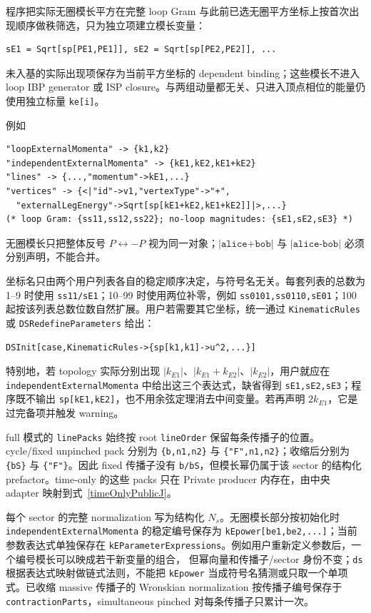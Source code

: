 ﻿\documentclass[a4paper,11pt]{article}
\begin{document}
程序把实际无圈模长平方在完整 loop Gram 与此前已选无圈平方坐标上按首次出现顺序做秩筛选，只为独立项建立模长变量：
\begin{verbatim}
sE1 = Sqrt[sp[PE1,PE1]], sE2 = Sqrt[sp[PE2,PE2]], ...
\end{verbatim}
未入基的实际出现项保存为当前平方坐标的 dependent binding；这些模长不进入 loop IBP generator 或 ISP closure。与两组动量都无关、只进入顶点相位的能量仍使用独立标量 \texttt{ke[i]}。

例如
\begin{verbatim}
"loopExternalMomenta" -> {k1,k2}
"independentExternalMomenta" -> {kE1,kE2,kE1+kE2}
"lines" -> {...,"momentum"->kE1,...}
"vertices" -> {<|"id"->v1,"vertexType"->"+",
  "externalLegEnergy"->Sqrt[sp[kE1+kE2,kE1+kE2]]|>,...}
(* loop Gram: {ss11,ss12,ss22}; no-loop magnitudes: {sE1,sE2,sE3} *)
\end{verbatim}
无圈模长只把整体反号 $P\leftrightarrow-P$ 视为同一对象；$|\texttt{alice+bob}|$ 与 $|\texttt{alice-bob}|$ 必须分别声明，不能合并。

坐标名只由两个用户列表各自的稳定顺序决定，与符号名无关。每套列表的总数为 1--9 时使用 \texttt{ss11/sE1}；10--99 时使用两位补零，例如 \texttt{ss0101,ss0110,sE01}；100 起按该列表总数位数自然扩展。用户若需要其它坐标，统一通过 \texttt{KinematicRules} 或 \texttt{DSRedefineParameters} 给出：
\begin{verbatim}
DSInit[case,KinematicRules->{sp[k1,k1]->u^2,...}]
\end{verbatim}

特别地，若 topology 实际分别出现 $|k_{E1}|$、$|k_{E1}+k_{E2}|$、$|k_{E2}|$，用户就应在 \texttt{independentExternal\allowbreak Momenta} 中给出这三个表达式，缺省得到 \texttt{sE1,sE2,sE3}；程序既不输出 \texttt{sp[kE1,kE2]}，也不用余弦定理消去中间变量。若再声明 $2k_{E1}$，它是过完备项并触发 warning。

full 模式的 \texttt{linePacks} 始终按 root \texttt{lineOrder} 保留每条传播子的位置。cycle/fixed unpinched pack 分别为 \texttt{\{b,n1,n2\}} 与 \texttt{\{"F",n1,n2\}}；收缩后分别为 \texttt{\{bS\}} 与 \texttt{\{"F"\}}。因此 fixed 传播子没有 \texttt{b/bS}，但模长幂仍属于该 sector 的结构化 prefactor。time-only 的这些 packs 只在 Private producer 内存在，由中央 adapter 映射到式~\eqref{timeOnlyPublicJ}。

每个 sector 的完整 normalization 写为结构化 $N_s$。无圈模长部分按初始化时
\texttt{independentExternalMomenta} 的稳定编号保存为
\texttt{kEpower[be1,be2,...]}；当前参数表达式单独保存在
\texttt{kEParameterExpressions}。例如用户重新定义参数后，一个编号模长可以映成若干新变量的组合，
但幂向量和传播子/sector 身份不变；\texttt{ds} 根据表达式映射做链式法则，不能把
\texttt{kEpower} 当成符号名猜测或只取一个单项式。已收缩 massive 传播子的 Wronskian normalization
按传播子编号保存于 \texttt{contractionParts}，simultaneous pinched 对每条传播子只累计一次。
\end{document}
